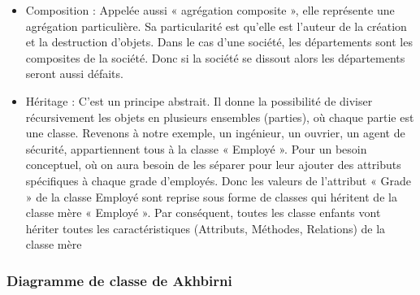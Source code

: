 \begin{itemize}
\begin{itemize}
	
	\item Composition : Appelée aussi « agrégation composite », elle représente une agrégation particulière. Sa particularité est qu’elle est l’auteur de la création et la destruction d’objets. Dans le cas d’une société, les départements sont les composites de la société. Donc si la société se dissout alors les départements seront aussi défaits.
	
	\item Héritage : C’est un principe abstrait. Il donne la possibilité de diviser récursivement les objets en plusieurs ensembles (parties), où chaque partie est une classe. Revenons à notre exemple, un ingénieur, un ouvrier, un agent de sécurité, appartiennent tous à la classe « Employé ». Pour un besoin conceptuel, où on aura besoin de les séparer pour leur ajouter des attributs spécifiques à chaque grade d’employés. Donc les valeurs de l’attribut « Grade » de la classe Employé sont reprise sous forme de classes qui héritent de la classe mère « Employé ». Par conséquent, toutes
	les classe enfants vont hériter toutes les caractéristiques (Attributs, Méthodes, Relations) de la classe mère

   \end{itemize}

\end{itemize}

\subsubsection{Diagramme de classe de Akhbirni}

